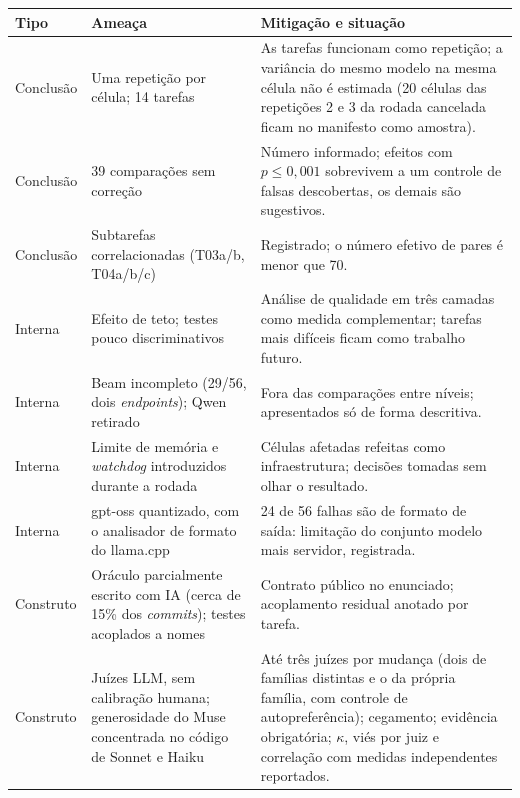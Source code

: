 \begin{quadro}[htb]
    \centering
    \ABNTEXfontereduzida
    \caption{\label{qdr:ameacas}Ameaças à validade, mitigação adotada e o que permanece em aberto}
    \begin{tabular}{|l|p{4.6cm}|p{7.6cm}|}
        \hline
        \textbf{Tipo} & \textbf{Ameaça} & \textbf{Mitigação e situação} \\
        \hline
        Conclusão & Uma repetição por célula; 14 tarefas & As tarefas funcionam como repetição; a variância do mesmo modelo na mesma célula não é estimada (20 células das repetições 2 e 3 da rodada cancelada ficam no manifesto como amostra). \\
        \hline
        Conclusão & 39 comparações sem correção & Número informado; efeitos com $p \le 0{,}001$ sobrevivem a um controle de falsas descobertas, os demais são sugestivos. \\
        \hline
        Conclusão & Subtarefas correlacionadas (T03a/b, T04a/b/c) & Registrado; o número efetivo de pares é menor que 70. \\
        \hline
        Interna & Efeito de teto; testes pouco discriminativos & Análise de qualidade em três camadas como medida complementar; tarefas mais difíceis ficam como trabalho futuro. \\
        \hline
        Interna & Beam incompleto (29/56, dois \textit{endpoints}); Qwen retirado & Fora das comparações entre níveis; apresentados só de forma descritiva. \\
        \hline
        Interna & Limite de memória e \textit{watchdog} introduzidos durante a rodada & Células afetadas refeitas como infraestrutura; decisões tomadas sem olhar o resultado. \\
        \hline
        Interna & gpt-oss quantizado, com o analisador de formato do llama.cpp & 24 de 56 falhas são de formato de saída: limitação do conjunto modelo mais servidor, registrada. \\
        \hline
        Construto & Oráculo parcialmente escrito com IA (cerca de 15\% dos \textit{commits}); testes acoplados a nomes & Contrato público no enunciado; acoplamento residual anotado por tarefa. \\
        \hline
        Construto & Juízes LLM, sem calibração humana; generosidade do Muse concentrada no código de Sonnet e Haiku & Até três juízes por mudança (dois de famílias distintas e o da própria família, com controle de autopreferência); cegamento; evidência obrigatória; $\kappa$, viés por juiz e correlação com medidas independentes reportados. \\

\end{tabular}
\end{quadro}

